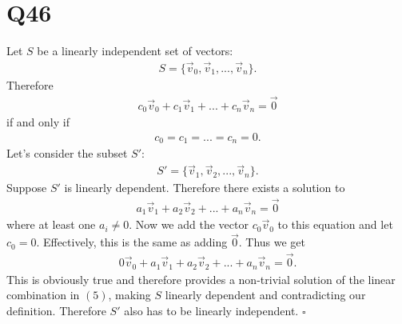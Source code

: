 \documentclass{article}
\begin{document}
\section*{Q46}
Let $S$ be a linearly independent set of vectors:
\begin{align}
	S=\{\vec v_0, \vec v_1, ..., \vec v_n\}.
\end{align}
Therefore
\begin{align}
	c_0\vec v_0 + c_1\vec v_1 + ... + c_n\vec v_n = \vec 0
\end{align}
if and only if
\begin{align}
	c_0 = c_1 = ... = c_n = 0.
\end{align}
Let's consider the subset $S'$:
\begin{align}
	S'=\{\vec v_1, \vec v_2, ..., \vec v_n\}.
\end{align}
Suppose $S'$ is linearly dependent. Therefore there exists a solution to
\begin{align}
	a_1\vec v_1 + a_2\vec v_2 + ... + a_n\vec v_n = \vec 0
\end{align}
where at least one $a_i\not=0$. Now we add the vector $c_0\vec v_0$ to this equation and let $c_0 = 0$.
Effectively, this is the same as adding $\vec 0$.
Thus we get
\begin{align}
	0\vec v_0 + a_1\vec v_1 + a_2\vec v_2 + ... + a_n\vec v_n = \vec 0.
\end{align}
This is obviously true and therefore provides a non-trivial solution of the linear combination in $(5)$, making $S$ linearly dependent and contradicting our definition.
Therefore $S'$ also has to be linearly independent. $\square$
\end{document}
